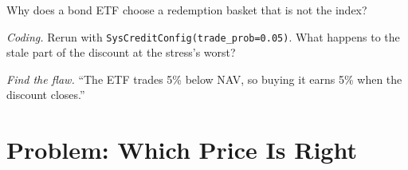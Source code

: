 \begin{exercise}[$\star\star$]\label{exo:s2:systematic-credit-and-bond-etf-arbitrage:6}
Why does a bond ETF choose a redemption basket that is not the index?
\end{exercise}

\begin{exercise}[$\star\star\star$]\label{exo:s2:systematic-credit-and-bond-etf-arbitrage:7}
\emph{Coding.} Rerun with \texttt{SysCreditConfig(trade\_prob=0.05)}. What happens to the stale part of the discount at the stress's worst?
\end{exercise}

\begin{exercise}[$\star\star\star$]\label{exo:s2:systematic-credit-and-bond-etf-arbitrage:8}
\emph{Find the flaw.} ``The ETF trades 5\% below NAV, so buying it earns 5\% when the discount closes.''
\end{exercise}

\section{Problem: Which Price Is Right}

